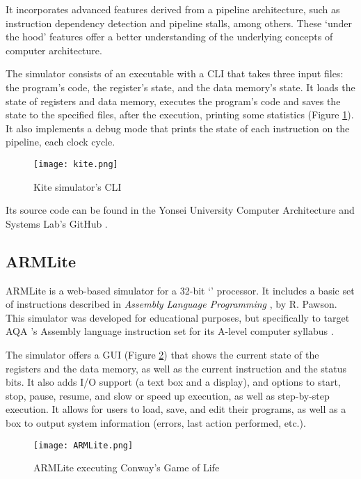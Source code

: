 It incorporates advanced features derived from a \gls{pipeline} architecture, such as \gls{instruction dependency} detection and \gls{pipeline stalls}, among others. These `under the hood' features offer a better understanding of the underlying concepts of computer architecture.

The simulator consists of an executable with a \gls{CLI} that takes three input files: the program's code, the register's state, and the data \gls{memory}'s state. It loads the state of registers and data \gls{memory}, executes the program's code and saves the state to the specified files, after the execution, printing some statistics (Figure \ref{fig:kite}). It also implements a \gls{debug} mode that prints the state of each instruction on the \gls{pipeline}, each \gls{clock cycle}.

\begin{figure}[h]
  \caption[Kite simulator's CLI]{Kite simulator's \gls{CLI}}
  \texttt{[image: kite.png]}
  \label{fig:kite}
\end{figure}

Its source code can be found in the Yonsei University Computer Architecture and Systems Lab's GitHub \parencite{kiteGH}.


\subsection*{ARMLite}\label{subsubsec:armlite}
ARMLite \parencite{ARMLite} is a web-based simulator for a 32-bit `' processor. It includes a basic set of instructions described in \textit{Assembly Language Programming} \parencite{PawsonRichard.2020Ass}, by R. Pawson. This simulator was developed for educational purposes, but specifically to target AQA \parencite{AQA}'s Assembly language instruction set for its A-level computer syllabus \parencite{AQAInstructionSet}.

The simulator offers a \gls{GUI} (Figure \ref{fig:armlite}) that shows the current state of the \glspl{register} and the data \gls{memory}, as well as the current instruction and the status bits. It also adds \gls{I/O} support (a text box and a display), and options to start, stop, pause, resume, and slow or speed up execution, as well as step-by-step execution. It allows for users to load, save, and edit their programs, as well as a box to output system information (errors, last action performed, etc.).

\begin{figure}[h]
  \caption[ARMLite executing Conway's Game of Life]{ARMLite executing Conway's Game of Life\normalfont \parencite{Gardner1970fantastic}}
  \texttt{[image: ARMLite.png]}
  \label{fig:armlite}
\end{figure}

